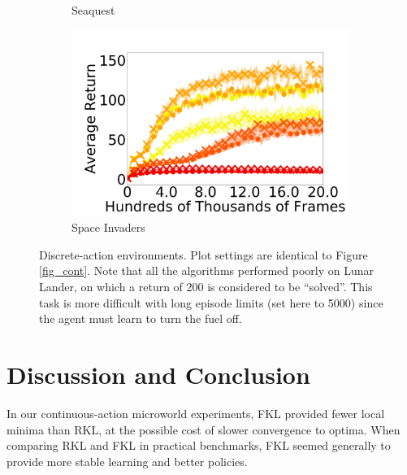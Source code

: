 \documentclass{article}
\begin{document}
\begin{figure}[t]
\begin{subfigure}[b]{0.25\linewidth}
    \caption{Seaquest
    }\label{fig:seaquest}
  \end{subfigure}%
  \begin{subfigure}[b]{0.25\linewidth}
    \centering
    \includegraphics[width=\columnwidth]{figs/deep/discrete/UNLABELED_space_invaders_all_kl.png} 
    \caption{Space Invaders
    }\label{fig:space-invaders}
  \end{subfigure}
  \caption{Discrete-action environments. Plot settings are identical to Figure \ref{fig_cont}. Note that all the algorithms performed poorly on Lunar Lander, on which a return of 200 is considered to be ``solved''. This task is more difficult with long episode limits (set here to 5000) since the agent must learn to turn the fuel off. }\label{fig_discrete}
\end{figure}






\section{Discussion and Conclusion} 

%
In our continuous-action microworld experiments, FKL provided fewer local minima than RKL, at the possible cost of slower convergence to optima. When comparing RKL and FKL in practical benchmarks, FKL seemed generally to provide more stable learning and better policies.
\end{document}
